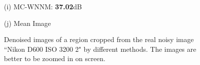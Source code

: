 \documentclass[10pt,onecolumn,letterpaper]{article}
\begin{document}
\begin{figure}
{\begin{minipage}[t]{0.195\textwidth}
{\footnotesize (i) MC-WNNM: \textbf{37.02}dB}
\end{minipage}
\begin{minipage}[t]{0.195\textwidth}
\centering
{}
{\footnotesize (j) Mean Image \cite{crosschannel2016}}
\end{minipage}
}
\caption{Denoised images of a region cropped from the real noisy image ``Nikon D600 ISO 3200 2" \cite{crosschannel2016} by different methods. The images are better to be zoomed in on screen.}
\label{fig5}
\end{figure}
\end{document}
